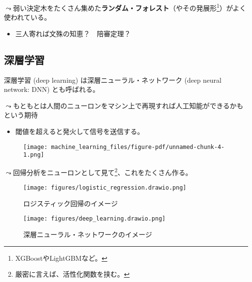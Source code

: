 \documentclass[
  xelatex,
  ja=standard]{bxjsarticle}
\providecommand{\tightlist}{%
  \setlength{\itemsep}{0pt}\setlength{\parskip}{0pt}}\usepackage{longtable,booktabs,array}
\begin{document}
\(\leadsto\)弱い決定木をたくさん集めた\textbf{ランダム・フォレスト}（やその発展形\footnote{XGBoostやLightGBMなど。}）がよく使われている。

\begin{itemize}
\tightlist
\item
  三人寄れば文殊の知恵？　陪審定理？
\end{itemize}

\hypertarget{ux6df1ux5c64ux5b66ux7fd2}{%
\subsection{深層学習}\label{ux6df1ux5c64ux5b66ux7fd2}}

深層学習 (deep learning) は深層ニューラル・ネットワーク (deep neural
network: DNN) とも呼ばれる。

\(\leadsto\)もともとは人間のニューロンをマシン上で再現すれば人工知能ができるかもという期待

\begin{itemize}
\tightlist
\item
  閾値を超えると発火して信号を送信する。
\end{itemize}

\begin{figure}[htpb]

{\centering \texttt{[image: machine\_learning\_files/figure-pdf/unnamed-chunk-4-1.png]}

}

\end{figure}

\(\leadsto\)回帰分析をニューロンとして見て\footnote{厳密に言えば、活性化関数を挟む。}、これをたくさん作る。

\begin{figure}[htpb]

{\centering \texttt{[image: figures/logistic\_regression.drawio.png]}

}

\caption{ロジスティック回帰のイメージ}

\end{figure}

\begin{figure}[htpb]

{\centering \texttt{[image: figures/deep\_learning.drawio.png]}

}

\caption{深層ニューラル・ネットワークのイメージ}

\end{figure}
\end{document}
